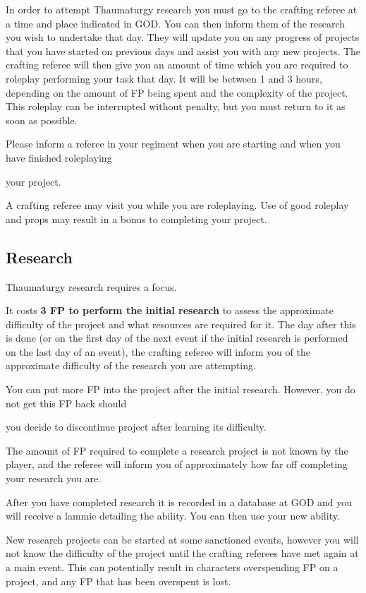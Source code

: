 In order to attempt Thaumaturgy research you must go to the crafting referee at a time and place indicated in GOD. You can then inform them of the research you wish to undertake that day. They will update you on any progress of projects that you have started on previous days and assist you with any new projects. The crafting referee will then give you an amount of time which you are required to roleplay performing your task that day. It will be between 1 and 3 hours, depending on the amount of FP being spent and the complexity of the project. This roleplay can be interrupted without penalty, but you must return to it as soon as possible.

Please inform a referee in your regiment when you are starting and when you have finished roleplaying

your project.

A crafting referee may visit you while you are roleplaying. Use of good roleplay and props may result in a bonus to completing your project.

\subsection{Research}

Thaumaturgy research requires a focus.

It costs \textbf{3 FP to perform the initial research} to assess the approximate difficulty of the project and what resources are required for it. The day after this is done (or on the first day of the next event if the initial research is performed on the last day of an event), the crafting referee will inform you of the approximate difficulty of the research you are attempting.

You can put more FP into the project after the initial research. However, you do not get this FP back should

you decide to discontinue project after learning its difficulty.

The amount of FP required to complete a research project is not known by the player, and the referee will inform you of approximately how far off completing your research you are.

After you have completed research it is recorded in a database at GOD and you will receive a lammie detailing the ability. You can then use your new ability.

New research projects can be started at some sanctioned events, however you will not know the difficulty of the project until the crafting referees have met again at a main event. This can potentially result in characters overspending FP on a project, and any FP that has been overspent is lost.


